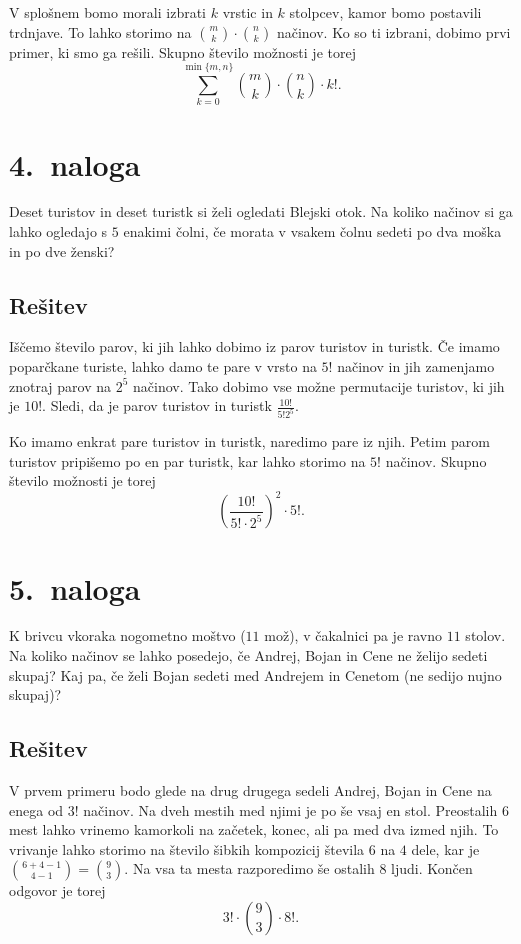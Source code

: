 \documentclass[11pt]{article}
\begin{document}
    V splošnem bomo morali izbrati \(k\) vrstic in \(k\) stolpcev, kamor bomo postavili trdnjave.
    To lahko storimo na \(\binom{m}{k} \cdot \binom{n}{k}\) načinov. Ko so ti izbrani, dobimo prvi primer, ki smo ga rešili.
    Skupno število možnosti je torej 
    \[\sum_{k = 0}^{\min\{m, n\}} \binom{m}{k} \cdot \binom{n}{k} \cdot k!.\]

\section*{4.~naloga}
Deset turistov in deset turistk si želi ogledati Blejski otok. Na koliko načinov si ga lahko
ogledajo s \(5\) enakimi čolni, če morata v vsakem čolnu sedeti po dva moška in po dve ženski?

\subsection*{Rešitev}
    Iščemo število parov, ki jih lahko dobimo iz parov turistov in turistk.
    Če imamo poparčkane turiste, lahko damo te pare v vrsto na \(5!\) načinov in jih zamenjamo znotraj parov na \(2^5\) načinov. 
    Tako dobimo vse možne permutacije turistov, ki jih je \(10!\). Sledi, da je parov turistov in turistk \(\frac{10!}{5!2^5}\). 

    Ko imamo enkrat pare turistov in turistk, naredimo pare iz njih. Petim parom turistov pripišemo
    po en par turistk, kar lahko storimo na \(5!\) načinov. Skupno število možnosti je torej 
    \[{\left(\frac{10!}{5! \cdot 2^5}\right)}^2 \cdot 5!.\]

\section*{5.~naloga}
K brivcu vkoraka nogometno moštvo (\(11\) mož), v čakalnici pa je ravno \(11\) stolov. Na koliko
načinov se lahko posedejo, če Andrej, Bojan in Cene ne želijo sedeti skupaj? Kaj pa, če želi
Bojan sedeti med Andrejem in Cenetom (ne sedijo nujno skupaj)?
\subsection*{Rešitev}
    V prvem primeru bodo glede na drug drugega sedeli Andrej, Bojan in Cene na enega od \(3!\) načinov.
    Na dveh mestih med njimi je po še vsaj en stol. Preostalih \(6\) mest lahko vrinemo kamorkoli na začetek, konec, 
    ali pa med dva izmed njih. To vrivanje lahko storimo na število šibkih kompozicij števila \(6\) na \(4\) dele,
    kar je \(\binom{6 + 4 - 1}{4 - 1} = \binom{9}{3}\). Na vsa ta mesta razporedimo še ostalih \(8\) ljudi. Končen odgovor je torej
    \[3! \cdot \binom{9}{3} \cdot 8!.\]
\end{document}
